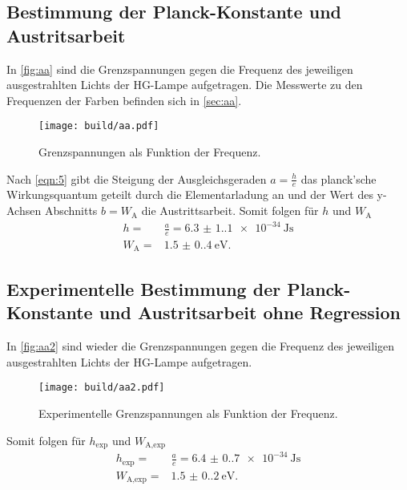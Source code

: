 \subsection{Bestimmung der Planck-Konstante und Austritsarbeit}
\label{sec:planckWa}
\noindent In \autoref{fig:aa} sind die Grenzspannungen gegen die 
Frequenz des jeweiligen ausgestrahlten Lichts der HG-Lampe aufgetragen. Die
Messwerte zu den Frequenzen der Farben befinden sich in \autoref{sec:aa}. 
\begin{figure}[H]
    \centering
    \caption{Grenzspannungen als Funktion der Frequenz.}
    \label{fig:aa}
    \texttt{[image: build/aa.pdf]}
\end{figure} 
\noindent Nach \autoref{eqn:5} gibt die Steigung der Ausgleichsgeraden 
$a = \frac{h}{e}$ das planck'sche Wirkungsquantum geteilt durch die 
Elementarladung an und der Wert des y-Achsen Abschnitts $b =  W_\text{A}$
die Austrittsarbeit. Somit folgen für $h$ und $W_\text{A}$
\begin{align}
    h =& \frac{a}{e} = \qty{6.3(1.1)e-34}{\joule\second}\\
    W_\text{A} =& \qty{1.5(0.4)}{\eV}.
\end{align}

\subsection{Experimentelle Bestimmung der Planck-Konstante und Austritsarbeit ohne Regression}
\label{sec:planckWa}
\noindent In \autoref{fig:aa2} sind wieder die Grenzspannungen gegen die 
Frequenz des jeweiligen ausgestrahlten Lichts der HG-Lampe aufgetragen. 
\begin{figure}[H]
    \centering
    \caption{Experimentelle Grenzspannungen als Funktion der Frequenz.}
    \label{fig:aa2}
    \texttt{[image: build/aa2.pdf]}
\end{figure} 
\noindent Somit folgen für $h_\text{exp} $ und $W_\text{A,exp}$
\begin{align}
    h_\text{exp} =& \frac{a}{e} = \qty{6.4(0.7)e-34}{\joule\second}\\
    W_\text{A,exp} =& \qty{1.5(0.2)}{\eV}.
\end{align}